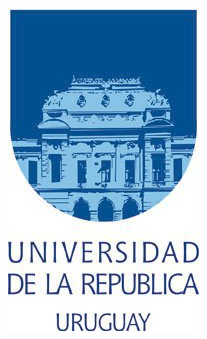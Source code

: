 \documentclass[a4paper,11pt]{article}
\begin{document}
\begin{minipage}[t]{.1\textwidth}      
\vspace{0.0mm}      
\includegraphics[width=.95\textwidth]{../../../../../../sources/Figs/logo_udelar}      
\end{minipage}      

\vspace{1cm}       
\end{document}
